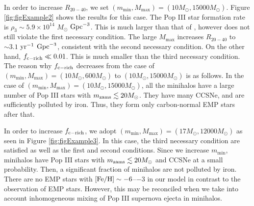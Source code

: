 \documentclass[pdftex]{pasj01}
\newcommand{\msun}{M_\odot}
\newcommand{\pyr}{{\rm yr}^{-1}}
\newcommand{\cgpc}{{\rm Gpc}^{-3}}
\newcommand{\mzams}{m_{\rm zams}}
\newcommand{\dthree}{\rho_{3}}
\newcommand{\mlmax}{M_{\max}}
\newcommand{\msmin}{m_{\min}}
\newcommand{\ratetarget}{R_{20-40}}
\newcommand{\fcemp}{f_{\rm c-rich}}
\begin{document}
In order to increase $\ratetarget$, we set $(\msmin, \mlmax) =
(10\msun, 15000\msun)$. Figure \ref{fig:figExample2} shows the results
for this case. The Pop III star formation rate is $\dthree \sim 5.9
\times 10^{14}$ $\msun$ $\cgpc$. This is much larger than that of
\citet{2020MNRAS.492.4386S}, however does not still violate the first
necessary condition. The large $\mlmax$ increases $\ratetarget$ to
$\sim 3.1$ $\pyr$ $\cgpc$, consistent with the second necessary
condition. On the other hand, $\fcemp \ll 0.01$. This is much smaller
than the third necessary condition. The reason why $\fcemp$ decreases
from the case of $(\msmin, \mlmax) = (10\msun, 600\msun)$ to
$(10\msun, 15000\msun)$ is as follows. In the case of $(\msmin,
\mlmax) = (10\msun, 15000\msun)$, all the minihalos have a large
number of Pop III stars with $\mzams \lesssim 20 \msun$. They have
many CCSNe, and are sufficiently polluted by iron. Thus, they form
only carbon-normal EMP stars after that.

In order to increase $\fcemp$, we adopt $(\msmin, \mlmax) = (17\msun,
12000\msun)$ as seen in Figure \ref{fig:figExample3}. In this case,
the third necessary condition are satisfied as well as the first and
second conditions. Since we increase $\msmin$, minihalos have Pop III
stars with $\mzams \lesssim 20 \msun$ and CCSNe at a small
probability. Then, a significant fraction of minihalos are not
polluted by iron. There are no EMP stars with ${\rm [Fe/H]} \sim
-6$--$-3$ in our model in contrast to the observation of EMP
stars. However, this may be reconciled when we take into account
inhomogeneous mixing of Pop III supernova ejecta in minihalos.
\end{document}
